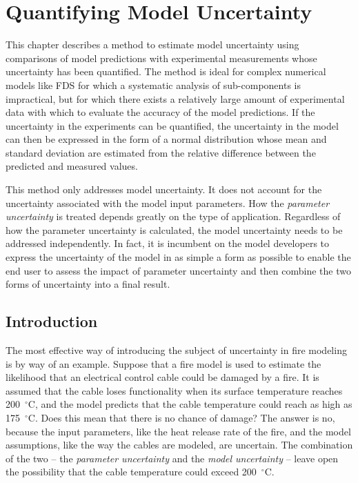 
\chapter{Quantifying Model Uncertainty}

This chapter describes a method to estimate model uncertainty using comparisons of model predictions with experimental
measurements whose uncertainty has been quantified. The method is ideal for complex numerical models like FDS for which
a systematic analysis of sub-components is impractical, but
for which there exists a relatively large amount of experimental data with which to evaluate the accuracy of the model predictions.
If the uncertainty in the experiments can be quantified, the uncertainty in the model can then be expressed in the form
of a normal distribution whose mean
and standard deviation are estimated from the relative difference between the predicted and measured values.

This method only addresses model uncertainty. It does not account for the uncertainty associated with the model input parameters.
How the {\em parameter uncertainty} is treated depends greatly on the type of application.
Regardless of how the parameter uncertainty is calculated, the model
uncertainty needs to be addressed independently. In fact, it is incumbent on the model developers to express
the uncertainty of the model in as simple a form as possible to enable the end user to assess the impact of
parameter uncertainty and then combine the two forms of uncertainty into a final result.


\section{Introduction}

The most effective way of introducing the subject of uncertainty in fire modeling is by way of an example.
Suppose that a fire model is used to estimate the likelihood that an electrical control cable could be damaged by
a fire. It is assumed that the cable loses functionality when its surface temperature reaches 200~$^\circ$C,
and the model predicts that the cable temperature could reach as high as 175~$^\circ$C.
Does this mean that there is no chance of damage? The answer is no, because the input parameters, like the heat release rate of
the fire, and the model assumptions, like the way the cables are modeled, are uncertain. The combination of the
two -- the {\em parameter uncertainty} and the {\em model uncertainty} -- leave open the possibility that the cable temperature could exceed
200~$^\circ$C.

